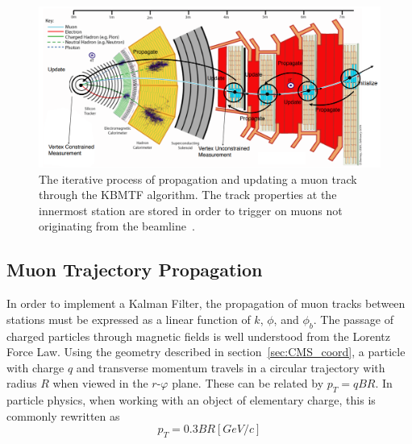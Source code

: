\begin{figure} [htb!]
	\centering
	\includegraphics[width=0.85\linewidth]{figs/04_muons/kbmtf_diagram.png}
	\caption[The iterative process of propagation and updating a muon track through the KBMTF algorithm. The track properties at the innermost station are stored in order to trigger on muons not originating from the beamline~\cite{CERN-LHCC-2020-004}]
	{The iterative process of propagation and updating a muon track through the KBMTF algorithm. The track properties at the innermost station are stored in order to trigger on muons not originating from the beamline~\cite{CERN-LHCC-2020-004}.}
	\label{fig:kbmtf}
\end{figure}

\subsection{Muon Trajectory Propagation} \label{sec:muons_prop}
In order to implement a Kalman Filter, the propagation of muon tracks between stations must be expressed as a linear function of $k$, $\phi$, and $\phi_b$. The passage of charged particles through magnetic fields is well understood from the Lorentz Force Law. Using the geometry described in section~\ref{sec:CMS_coord}, a particle with charge $q$ and transverse momentum travels in a circular trajectory with radius $R$ when viewed in the $r$-$\varphi$ plane. These can be related by $p_{T} = qBR$. In particle physics, when working with an object of elementary charge, this is commonly rewritten as
\begin{equation}
	\label{eq:pt03br}
	p_{T} = 0.3BR\unit{[GeV/c]}
\end{equation} 

